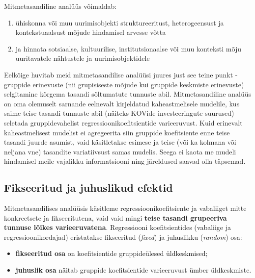 \documentclass[
]{book}
\providecommand{\tightlist}{%
  \setlength{\itemsep}{0pt}\setlength{\parskip}{0pt}}
\begin{document}
Mitmetasandiline analüüs võimaldab:

\begin{enumerate}
\def\labelenumi{\arabic{enumi}.}
\tightlist
\item
  ühiskonna või muu uurimisobjekti struktureeritust, heterogeensust ja kontekstuaalsust mõjude hindamisel arvesse võtta\\
\item
  ja hinnata sotsiaalse, kultuurilise, institutsionaalse või muu konteksti mõju uuritavatele nähtustele ja uurimisobjektidele
\end{enumerate}

Eelkõige huvitab meid mitmetasandilise analüüsi juures just see teine punkt - gruppide erinevuste (nii grupisiseste mõjude kui gruppide keskmiste erinevuste) selgitamine kõrgema tasandi sõltumatute tunnuste abil. Mitmetasandiline analüüs on oma olemuselt sarnande eelnevalt kirjeldatud kaheastmelisele mudelile, kus saime teise tasandi tunnuste abil (näiteks KOVide investeeringute suurused) seletada gruppidevahelist regressioonikoefitsientide varieeruvust. Kuid erinevalt kaheastmelisest mudelist ei agregeerita siin gruppide koefitsiente enne teise tasandi juurde asumist, vaid käsitletakse esimese ja teise (või ka kolmana või neljana vne) tasandite variatiivsust samas mudelis. Seega ei kaota me mudeli hindamisel meile vajalikku informatsiooni ning järeldused saavad olla täpsemad.

\hypertarget{fikseeritud-ja-juhuslikud-efektid}{%
\subsection{Fikseeritud ja juhuslikud efektid}\label{fikseeritud-ja-juhuslikud-efektid}}

Mitmetasandilises analüüsis käsitleme regressioonikoefitsiente ja vabaliiget mitte konkreetsete ja fikseeritutena, vaid vaid mingi \textbf{teise tasandi grupeeriva tunnuse lõikes varieeruvatena}. Regressiooni koefitsientides (vabaliige ja regressioonikordajad) eristatakse fikseeritud (\emph{fixed}) ja juhuslikku (\emph{random}) osa:

\begin{itemize}
\tightlist
\item
  \textbf{fikseeritud osa} on koefitsientide gruppideülesed üldkeskmised;
\item
  \textbf{juhuslik osa} näitab gruppide koefitsientide varieeruvust ümber üldkeskmiste.
\end{itemize}
\end{document}
